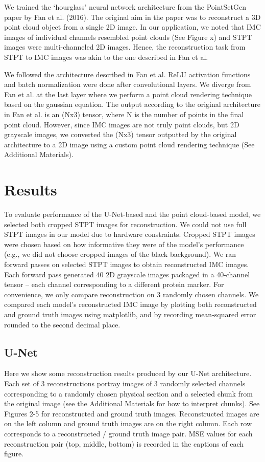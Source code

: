 \documentclass[10pt,twocolumn,letterpaper]{article}
\begin{document}
We trained the ‘hourglass’ neural network architecture from the PointSetGen paper by Fan et al. (2016). The original aim in the paper was to reconstruct a 3D point cloud object from a single 2D image. In our application, we noted that IMC images of individual channels resembled point clouds (See Figure x) and STPT images were multi-channeled 2D images. Hence, the reconstruction task from STPT to IMC images was akin to the one described in Fan et al.
 
We followed the architecture described in Fan et al. ReLU activation functions and batch normalization were done after convolutional layers. We diverge from Fan et al. at the last layer where we perform a point cloud rendering technique based on the gaussian equation. The output according to the original architecture in Fan et al. is an (Nx3) tensor, where N is the number of points in the final point cloud. However, since IMC images are not truly point clouds, but 2D grayscale images, we converted the (Nx3) tensor outputted by the original architecture to a 2D image using a custom point cloud rendering technique (See Additional Materials).

\section{Results}

To evaluate performance of the U-Net-based and the point cloud-based model, we selected both cropped STPT images for reconstruction. We could not use full STPT images in our model due to hardware constraints. Cropped STPT images were chosen based on how informative they were of the model’s performance (e.g., we did not choose cropped images of the black background). We ran forward passes on selected STPT images to obtain reconstructed IMC images. Each forward pass generated 40 2D grayscale images packaged in a 40-channel tensor – each channel corresponding to a different protein marker. For convenience, we only compare reconstruction on 3 randomly chosen channels. We compared each model’s reconstructed IMC image by plotting both reconstructed and ground truth images using matplotlib, and by recording mean-squared error rounded to the second decimal place.


\subsection{U-Net}
Here we show some reconstruction results produced by our U-Net architecture. Each set of 3 reconstructions portray images of 3 randomly selected channels corresponding to a randomly chosen physical section and a selected chunk from the original image (see the Additional Materials for how to interpret chunks). See Figures 2-5 for reconstructed and ground truth images. Reconstructed images are on the left column and ground truth images are on the right column. Each row corresponds to a reconstructed / ground truth image pair. MSE values for each reconstruction pair (top, middle, bottom) is recorded in the captions of each figure.  
\end{document}
